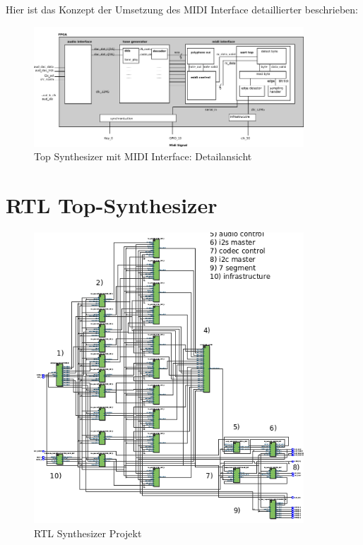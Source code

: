 Hier ist das Konzept der Umsetzung des MIDI Interface detaillierter beschrieben:

\begin{figure}[H]
	\includegraphics[width=0.9\textwidth]{images/midi_interface/top_synthesizer_detail_scaled.png}
	\caption{Top Synthesizer mit MIDI Interface: Detailansicht}
	\label{fig.top_synthesizer_detail}
\end{figure}

\chapter{RTL Top-Synthesizer}\label{chap.anhang_rtl_top_synthesizer}

\begin{figure}[H]
	\includegraphics[width=0.9\textwidth]{images/midi_interface/RTL_10_Decoder_Mixwer.png}
	\caption{RTL Synthesizer Projekt}
	\label{fig.rtl_top_synthesizer}
\end{figure}
